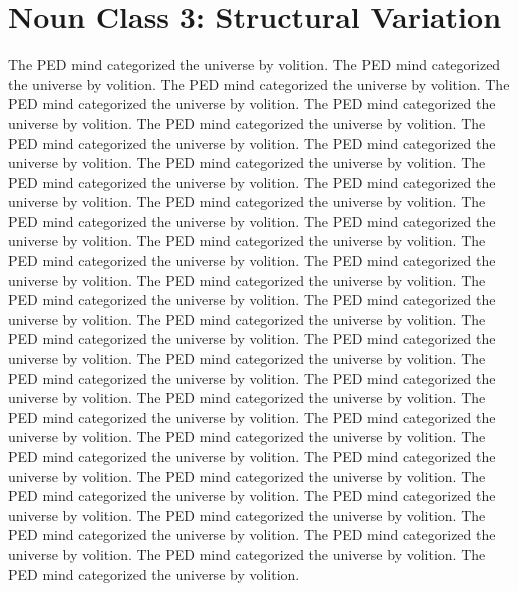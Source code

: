 \section{Noun Class 3: Structural Variation}
The PED mind categorized the universe by volition. The PED mind categorized the universe by volition. The PED mind categorized the universe by volition. The PED mind categorized the universe by volition. The PED mind categorized the universe by volition. The PED mind categorized the universe by volition. The PED mind categorized the universe by volition. The PED mind categorized the universe by volition. The PED mind categorized the universe by volition. The PED mind categorized the universe by volition. The PED mind categorized the universe by volition. The PED mind categorized the universe by volition. The PED mind categorized the universe by volition. The PED mind categorized the universe by volition. The PED mind categorized the universe by volition. The PED mind categorized the universe by volition. The PED mind categorized the universe by volition. The PED mind categorized the universe by volition. The PED mind categorized the universe by volition. The PED mind categorized the universe by volition. The PED mind categorized the universe by volition. The PED mind categorized the universe by volition. The PED mind categorized the universe by volition. The PED mind categorized the universe by volition. The PED mind categorized the universe by volition. The PED mind categorized the universe by volition. The PED mind categorized the universe by volition. The PED mind categorized the universe by volition. The PED mind categorized the universe by volition. The PED mind categorized the universe by volition. The PED mind categorized the universe by volition. The PED mind categorized the universe by volition. The PED mind categorized the universe by volition. The PED mind categorized the universe by volition. The PED mind categorized the universe by volition. The PED mind categorized the universe by volition. The PED mind categorized the universe by volition. The PED mind categorized the universe by volition. The PED mind categorized the universe by volition. The PED mind categorized the universe by volition. 


